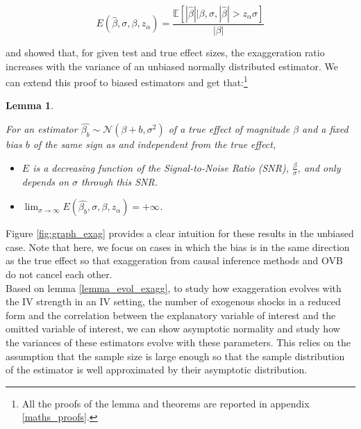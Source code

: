 \documentclass[usletter, 12pt]{article}
\newtheorem{lemma}{Lemma}
\begin{document}
				 \begin{equation}\label{exagg_general}
				 	E(\hat{\beta}, \sigma, \beta, z_{\alpha}) =
					 	\dfrac{\mathbb{E}\left[ | \hat{\beta} | \big| \beta, \sigma, |\hat{\beta}| > z_{\alpha} \sigma \right]}{| \beta |} 
				\end{equation}
				
			\cite{lu_note_2019} and \cite{zwet_significance_2021} showed that, for given test and true effect sizes, the exaggeration ratio increases with the variance of an unbiased normally distributed estimator. We can extend this proof to biased estimators and get that:\footnote{All the proofs of the lemma and theorems are reported in appendix \ref{maths_proofs}.}\label{lemma_evol_exagg}
			
			\begin{lemma}
				\label{lemma_drivers}
			
				For an estimator $\hat{\beta_{b}}  \sim \mathcal{N}(\beta + b, \sigma^{2})$ of a true effect of magnitude $\beta$ and a fixed bias $b$ of the same sign as and independent from the true effect,
				
				\begin{itemize}
					\item $E$ is a decreasing function of the Signal-to-Noise Ratio (SNR), $\frac{\beta}{\sigma}$, and only depends on $\sigma$ through this SNR. 
					\item  $\lim_{\sigma\to \infty} E(\hat{\beta_{b}}, \sigma, \beta, z_{\alpha}) = +\infty$.
				\end{itemize}
			\end{lemma}
			
				Figure \ref{fig:graph_exag} provides a clear intuition for these results in the unbiased case. Note that here, we focus on cases in which the bias is in the same direction as the true effect so that exaggeration from causal inference methods and OVB do not cancel each other.\\
				 
				 Based on lemma \ref{lemma_evol_exagg}, to study how exaggeration evolves with the IV strength in an IV setting, the number of exogenous shocks in a reduced form and the correlation between the explanatory variable of interest and the omitted variable of interest, we can show asymptotic normality and study how the variances of these estimators evolve with these parameters. This relies on the assumption that the sample size is large enough so that the sample distribution of the estimator is well approximated by their asymptotic distribution.
				 				 
\end{document}
